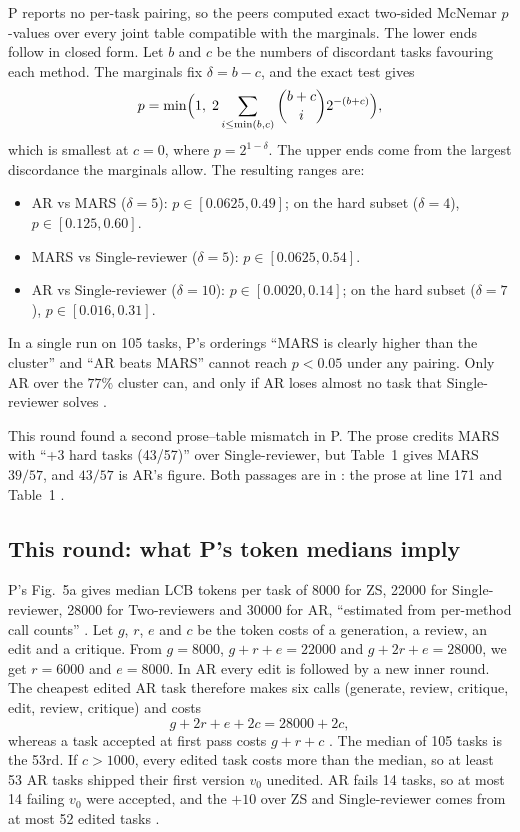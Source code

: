 \documentclass{article}
\begin{document}
P reports no per-task pairing, so the peers computed exact two-sided McNemar \(p\)-values over every joint table compatible with the marginals. The lower ends follow in closed form. Let \(b\) and \(c\) be the numbers of discordant tasks favouring each method. The marginals fix \(\delta=b-c\), and the exact test gives
\[
  p=\min\Bigl(1,\; 2\sum_{i\le \min(b,c)}\binom{b+c}{i}2^{-(b+c)}\Bigr),
\]
which is smallest at \(c=0\), where \(p=2^{1-\delta}\). The upper ends come from the largest discordance the marginals allow. The resulting ranges  are:
\begin{itemize}
\item AR vs MARS (\(\delta=5\)): \(p\in[0.0625, 0.49]\); on the hard subset (\(\delta=4\)), \(p\in[0.125, 0.60]\).
\item MARS vs Single-reviewer (\(\delta=5\)): \(p\in[0.0625, 0.54]\).
\item AR vs Single-reviewer (\(\delta=10\)): \(p\in[0.0020, 0.14]\); on the hard subset (\(\delta=7\)), \(p\in[0.016, 0.31]\).
\end{itemize}

\begin{claim}
In a single run on 105 tasks, P's orderings ``MARS is clearly higher than the cluster'' and ``AR beats MARS'' cannot reach \(p<0.05\) under any pairing. Only AR over the \(77\%\) cluster can, and only if AR loses almost no task that Single-reviewer solves .
\end{claim}

This round found a second prose--table mismatch in P. The prose credits MARS with ``+3 hard tasks (43/57)'' over Single-reviewer, but Table~1 gives MARS \(39/57\), and \(43/57\) is AR's figure. Both passages are in : the prose at line 171 and Table~1 .

\subsection{This round: what P's token medians imply}
P's Fig.~5a gives median LCB tokens per task of 8000 for ZS, 22000 for Single-reviewer, 28000 for Two-reviewers and 30000 for AR, ``estimated from per-method call counts'' . Let \(g\), \(r\), \(e\) and \(c\) be the token costs of a generation, a review, an edit and a critique. From \(g=8000\), \(g+r+e=22000\) and \(g+2r+e=28000\), we get \(r=6000\) and \(e=8000\). In AR every edit is followed by a new inner round. The cheapest edited AR task therefore makes six calls (generate, review, critique, edit, review, critique) and costs
\[
  g+2r+e+2c = 28000+2c,
\]
whereas a task accepted at first pass costs \(g+r+c\) . The median of 105 tasks is the 53rd. If \(c>1000\), every edited task costs more than the median, so at least 53 AR tasks shipped their first version \(v_0\) unedited. AR fails 14 tasks, so at most 14 failing \(v_0\) were accepted, and the \(+10\) over ZS and Single-reviewer comes from at most 52 edited tasks .
\end{document}
